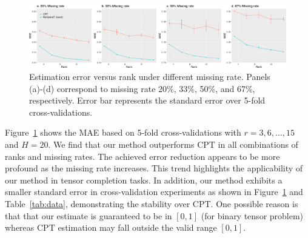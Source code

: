 \documentclass[11pt]{article}
\theoremstyle{plain}
\theoremstyle{definition}
\begin{document}
\begin{figure}[h!]
\includegraphics[width = \textwidth]{figure/brain_sim.pdf}
\caption{Estimation error versus rank under different missing rate. Panels (a)-(d) correspond to missing rate 20\%, 33\%, 50\%, and 67\%, respectively. Error bar represents the standard error over 5-fold cross-validations.}\label{fig:braincv}
\end{figure}

Figure~\ref{fig:braincv} shows the MAE based on 5-fold cross-validations with $r = 3,6,\ldots, 15$ and $H = 20$. We find that our method outperforms CPT in all combinations of ranks and missing rates. The achieved error reduction appears to be more profound as the missing rate increases. This trend highlights the applicability of our method in tensor completion tasks. In addition, our method exhibits a smaller standard error in cross-validation experiments as shown in Figure~\ref{fig:braincv} and Table~\ref{tab:data}, demonstrating the stability over CPT.  One possible reason is that that our estimate is guaranteed to be in $[0,1]$ (for binary tensor problem) whereas CPT estimation may fall outside the valid range $[0,1]$. 
\end{document}
